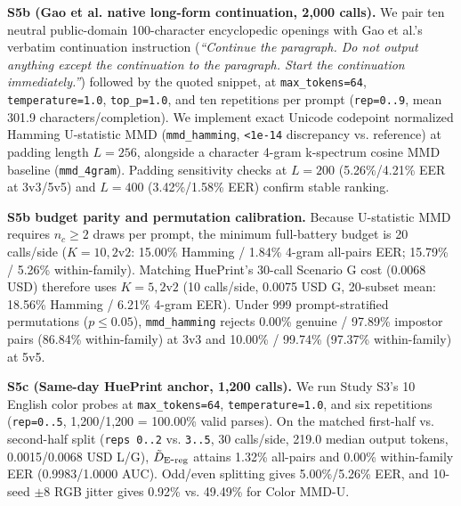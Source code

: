 \textbf{S5b (Gao et al. \cite{ref4} native long-form continuation, 2,000 calls).} We pair ten neutral public-domain 100-character encyclopedic openings with Gao et al.'s verbatim continuation instruction (\emph{``Continue the paragraph. Do not output anything except the continuation to the paragraph. Start the continuation immediately.''}) followed by the quoted snippet, at \texttt{max\_\allowbreak{}tokens=\allowbreak{}64}, \texttt{temperature=\allowbreak{}1.\allowbreak{}0}, \texttt{top\_\allowbreak{}p=\allowbreak{}1.\allowbreak{}0}, and ten repetitions per prompt (\texttt{rep=\allowbreak{}0.\allowbreak{}.\allowbreak{}9}, mean 301.9 characters/completion). We implement exact Unicode codepoint normalized Hamming U-statistic MMD (\texttt{mmd\_\allowbreak{}hamming}, \texttt{<1e-\allowbreak{}14} discrepancy vs. reference) at padding length $L=256$, alongside a character 4-gram k-spectrum cosine MMD baseline (\texttt{mmd\_\allowbreak{}4gram}). Padding sensitivity checks at $L=200$ (5.26\%/4.21\% EER at 3v3/5v5) and $L=400$ (3.42\%/1.58\% EER) confirm stable ranking.


\textbf{S5b budget parity and permutation calibration.} Because U-statistic MMD requires $n_c \ge 2$ draws per prompt, the minimum full-battery budget is 20 calls/side ($K=10, 2\text{v}2$: 15.00\% Hamming / 1.84\% 4-gram all-pairs EER; 15.79\% / 5.26\% within-family). Matching HuePrint's 30-call Scenario G cost (0.0068 USD) therefore uses $K=5, 2\text{v}2$ (10 calls/side, 0.0075 USD G, 20-subset mean: 18.56\% Hamming / 6.21\% 4-gram EER). Under 999 prompt-stratified permutations ($p \le 0.05$), \texttt{mmd\_\allowbreak{}hamming} rejects 0.00\% genuine / 97.89\% impostor pairs (86.84\% within-family) at 3v3 and 10.00\% / 99.74\% (97.37\% within-family) at 5v5.


\textbf{S5c (Same-day HuePrint anchor, 1,200 calls).} We run Study S3's 10 English color probes at \texttt{max\_\allowbreak{}tokens=\allowbreak{}64}, \texttt{temperature=\allowbreak{}1.\allowbreak{}0}, and six repetitions (\texttt{rep=\allowbreak{}0.\allowbreak{}.\allowbreak{}5}, 1,200/1,200 = 100.00\% valid parses). On the matched first-half vs. second-half split (\texttt{reps 0.\allowbreak{}.\allowbreak{}2} vs. \texttt{3.\allowbreak{}.\allowbreak{}5}, 30 calls/side, 219.0 median output tokens, 0.0015/0.0068 USD L/G), $\tilde D_{\mathrm{E\mbox{-}reg}}{}$ attains 1.32\% all-pairs and 0.00\% within-family EER (0.9983/1.0000 AUC). Odd/even splitting gives 5.00\%/5.26\% EER, and 10-seed $\pm 8$ RGB jitter gives 0.92\% vs. 49.49\% for Color MMD-U.


